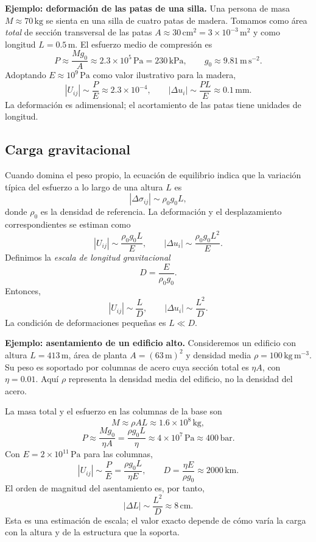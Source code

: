 \textbf{Ejemplo: deformación de las patas de una silla.}
Una persona de masa $M\approx70\,\mathrm{kg}$ se sienta en una silla de cuatro patas de madera. Tomamos como área \emph{total} de sección transversal de las patas $A\approx30\,\mathrm{cm}^2=3\times10^{-3}\,\mathrm{m}^2$ y como longitud $L=0.5\,\mathrm m$. El esfuerzo medio de compresión es
\[
P\approx\frac{Mg_0}{A}\approx2.3\times10^5\,\mathrm{Pa}
=230\,\mathrm{kPa},
\qquad g_0\approx9.81\,\mathrm{m\,s^{-2}}.
\]
Adoptando $E\approx10^9\,\mathrm{Pa}$ como valor ilustrativo para la madera,
\[
|U_{ij}|\sim\frac{P}{E}\approx2.3\times10^{-4},
\qquad
|\Delta u_i|\sim\frac{PL}{E}\approx0.1\,\mathrm{mm}.
\]
La deformación es adimensional; el acortamiento de las patas tiene unidades de longitud.

\subsection{Carga gravitacional}

Cuando domina el peso propio, la ecuación de equilibrio indica que la variación típica del esfuerzo a lo largo de una altura $L$ es
\[
|\Delta\sigma_{ij}|\sim\rho_0g_0L,
\]
donde $\rho_0$ es la densidad de referencia. La deformación y el desplazamiento correspondientes se estiman como
\[
|U_{ij}|\sim\frac{\rho_0g_0L}{E},
\qquad
|\Delta u_i|\sim\frac{\rho_0g_0L^2}{E}.
\]
Definimos la \emph{escala de longitud gravitacional}
\[
D=\frac{E}{\rho_0g_0}.
\]
Entonces,
\[
\boxed{|U_{ij}|\sim\frac{L}{D}},
\qquad
\boxed{|\Delta u_i|\sim\frac{L^2}{D}}.
\]
La condición de deformaciones pequeñas es $L\ll D$.

\textbf{Ejemplo: asentamiento de un edificio alto.}
Consideremos un edificio con altura $L=413\,\mathrm m$, área de planta $A=(63\,\mathrm m)^2$ y densidad media $\rho=100\,\mathrm{kg\,m^{-3}}$. Su peso es soportado por columnas de acero cuya sección total es $\eta A$, con $\eta=0.01$. Aquí $\rho$ representa la densidad media del edificio, no la densidad del acero.

La masa total y el esfuerzo en las columnas de la base son
\[
M\approx\rho AL\approx1.6\times10^8\,\mathrm{kg},
\]
\[
P\approx\frac{Mg_0}{\eta A}
=\frac{\rho g_0L}{\eta}
\approx4\times10^7\,\mathrm{Pa}
\approx400\,\mathrm{bar}.
\]
Con $E=2\times10^{11}\,\mathrm{Pa}$ para las columnas,
\[
|U_{ij}|\sim\frac{P}{E}
=\frac{\rho g_0L}{\eta E},
\qquad
D=\frac{\eta E}{\rho g_0}\approx2000\,\mathrm{km}.
\]
El orden de magnitud del asentamiento es, por tanto,
\[
|\Delta L|\sim\frac{L^2}{D}\approx8\,\mathrm{cm}.
\]
Esta es una estimación de escala; el valor exacto depende de cómo varía la carga con la altura y de la estructura que la soporta.

